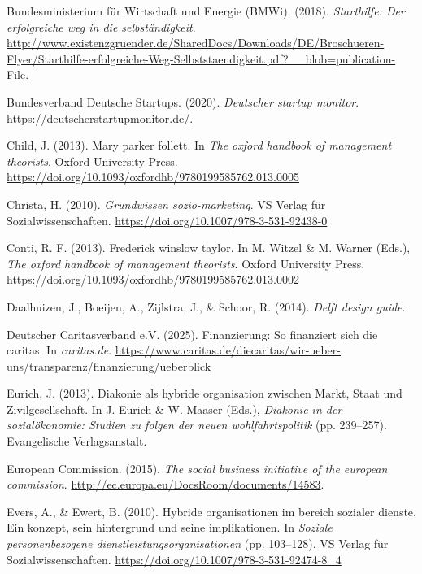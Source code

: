 \documentclass[
  letterpaper,
]{book}
\newlength{\cslhangindent}
\newenvironment{CSLReferences}[2] %
 {\begin{list}{}{%
  \setlength{\itemindent}{0pt}
  \setlength{\leftmargin}{0pt}
  \setlength{\parsep}{0pt}
  \ifodd #1
   \setlength{\leftmargin}{\cslhangindent}
   \setlength{\itemindent}{-1\cslhangindent}
  \fi
  \setlength{\itemsep}{#2\baselineskip}}}
 {\end{list}}
\begin{document}
\begin{CSLReferences}{1}{0}
Bundesministerium für Wirtschaft und Energie (BMWi). (2018).
\emph{Starthilfe: Der erfolgreiche weg in die selbständigkeit}.
\url{http://www.existenzgruender.de/SharedDocs/Downloads/DE/Broschueren-Flyer/Starthilfe-erfolgreiche-Weg-Selbststaendigkeit.pdf?__blob=publication-File}.

Bundesverband Deutsche Startups. (2020). \emph{Deutscher startup
monitor}. \url{https://deutscherstartupmonitor.de/}.

Child, J. (2013). Mary parker follett. In \emph{The oxford handbook of
management theorists}. Oxford University Press.
\url{https://doi.org/10.1093/oxfordhb/9780199585762.013.0005}

Christa, H. (2010). \emph{Grundwissen sozio-marketing}. VS Verlag für
Sozialwissenschaften. \url{https://doi.org/10.1007/978-3-531-92438-0}

Conti, R. F. (2013). Frederick winslow taylor. In M. Witzel \& M. Warner
(Eds.), \emph{The oxford handbook of management theorists}. Oxford
University Press.
\url{https://doi.org/10.1093/oxfordhb/9780199585762.013.0002}

Daalhuizen, J., Boeijen, A., Zijlstra, J., \& Schoor, R. (2014).
\emph{Delft design guide}.

Deutscher Caritasverband e.V. (2025). Finanzierung: So finanziert sich
die caritas. In \emph{caritas.de}.
\url{https://www.caritas.de/diecaritas/wir-ueber-uns/transparenz/finanzierung/ueberblick}

Eurich, J. (2013). Diakonie als hybride organisation zwischen {Markt},
{Staat} und {Zivilgesellschaft}. In J. Eurich \& W. Maaser (Eds.),
\emph{Diakonie in der sozialökonomie: Studien zu folgen der neuen
wohlfahrtspolitik} (pp. 239--257). Evangelische Verlagsanstalt.

European Commission. (2015). \emph{The social business initiative of the
european commission}.
\url{http://ec.europa.eu/DocsRoom/documents/14583}.

Evers, A., \& Ewert, B. (2010). Hybride organisationen im bereich
sozialer dienste. Ein konzept, sein hintergrund und seine implikationen.
In \emph{Soziale personenbezogene dienstleistungsorganisationen} (pp.
103--128). VS Verlag für Sozialwissenschaften.
\url{https://doi.org/10.1007/978-3-531-92474-8_4}


\end{CSLReferences}
\end{document}
